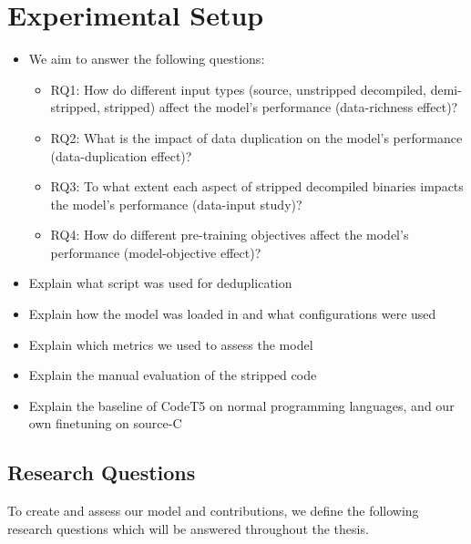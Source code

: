 \chapter{Experimental Setup}
\label{ExperimentalSetup}
\begin{itemize}
    \item We aim to answer the following questions:
    \begin{itemize}
        \item RQ1: How do different input types (source, unstripped decompiled, demi-stripped, stripped) affect the model's performance (data-richness effect)?
        \item RQ2: What is the impact of data duplication on the model's performance (data-duplication effect)?
        \item RQ3: To what extent each aspect of stripped decompiled binaries impacts the model's performance (data-input study)?
        \item RQ4: How do different pre-training objectives affect the model's performance (model-objective effect)?
    \end{itemize}
    \item Explain what script was used for deduplication
    \item Explain how the model was loaded in and what configurations were used
    \item Explain which metrics we used to assess the model
    \item Explain the manual evaluation of the stripped code
    \item Explain the baseline of CodeT5 on normal programming languages, and our own finetuning on source-C
\end{itemize}

\newpage

\section{Research Questions}
To create and assess our model and contributions, we define the following research questions which will be answered throughout the thesis. 

